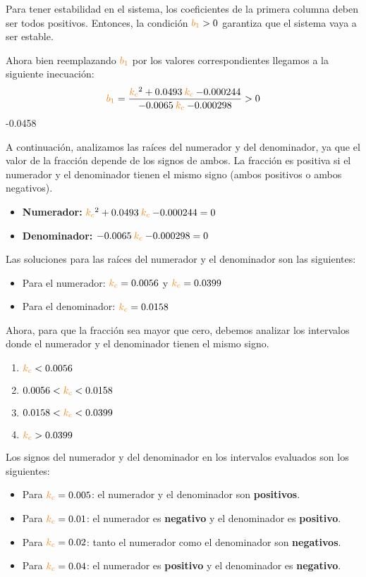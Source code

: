 Para tener estabilidad en el sistema, los coeficientes de la primera columna
deben ser todos positivos. Entonces, la condición $\nara{b_1} > 0$ garantiza
que el sistema vaya a ser estable.

Ahora bien reemplazando $\nara{b_1}$ por los valores correspondientes llegamos
a la siguiente inecuación:
\begin{equation}
    \nara{b_1} = \frac{\nara{k_c}^2  +0.0493 \nara{k_c}  -0.000244}{-0.0065 \nara{k_c}  -0.000298} > 0
\end{equation}
-0.0458


A continuación, analizamos las raíces del numerador y del denominador, ya que
el valor de la fracción depende de los signos de ambos. La fracción es positiva
si el numerador y el denominador tienen el mismo signo (ambos positivos o ambos
negativos).
\begin{itemize}
    \item \textbf{Numerador:} \( \nara{k_c}^2  +0.0493 \nara{k_c}  -0.000244 = 0 \)
    \item \textbf{Denominador:} \(-0.0065 \nara{k_c}  -0.000298 = 0 \)
\end{itemize}

Las soluciones para las raíces del numerador y el denominador son las siguientes:
\begin{itemize}
    \item Para el numerador: \( \nara{k_c} = 0.0056 \) y \( \nara{k_c} = 0.0399 \)
    \item Para el denominador: \( \nara{k_c} = 0.0158 \)
\end{itemize}

Ahora, para que la fracción sea mayor que cero, debemos analizar los intervalos
donde el numerador y el denominador tienen el mismo signo.
\begin{enumerate}
    \item \( \nara{k_c} < 0.0056 \)
    \item \( 0.0056 < \nara{k_c} < 0.0158 \)
    \item \( 0.0158 < \nara{k_c} < 0.0399 \)
    \item \( \nara{k_c} > 0.0399 \)
\end{enumerate}

Los signos del numerador y del denominador en los intervalos evaluados son los siguientes:
\begin{itemize}
    \item Para \( \nara{k_c} = 0.005 \): el numerador y el denominador son \textbf{positivos}.
    \item Para \( \nara{k_c} = 0.01 \): el numerador es \textbf{negativo} y el denominador es \textbf{positivo}.
    \item Para \( \nara{k_c} = 0.02 \): tanto el numerador como el denominador son \textbf{negativos}.
    \item Para \( \nara{k_c} = 0.04 \): el numerador es \textbf{positivo} y el denominador es \textbf{negativo}.
\end{itemize}

